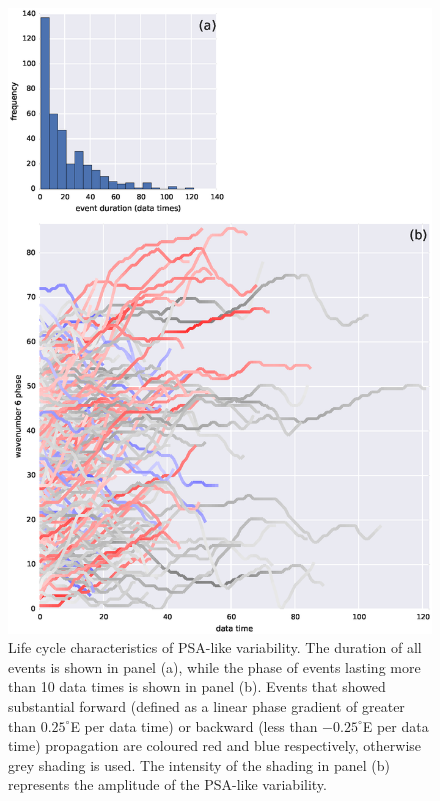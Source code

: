 \begin{figure}
\begin{center}
\includegraphics[width=0.7\columnwidth]{figures/psa/psa-event-summary_wave6-duration-gt10_ERAInterim_500hPa-lat10S10Nmean-lon115E235Ezeropad_030day-runmean-anom-wrt-all_native-np20N260E.eps}
\caption[Life cycle characteristics of PSA-like variability]{\label{fig:lifecycle}
Life cycle characteristics of PSA-like variability. The duration of all events is shown in panel (a), while the phase of events lasting more than 10 data times is shown in panel (b). Events that showed substantial forward (defined as a linear phase gradient of greater than $0.25^{\circ}$E per data time) or backward (less than $-0.25^{\circ}$E per data time) propagation are coloured red and blue respectively, otherwise grey shading is used. The intensity of the shading in panel (b) represents the amplitude of the PSA-like variability.%
}
\end{center}
\end{figure}

